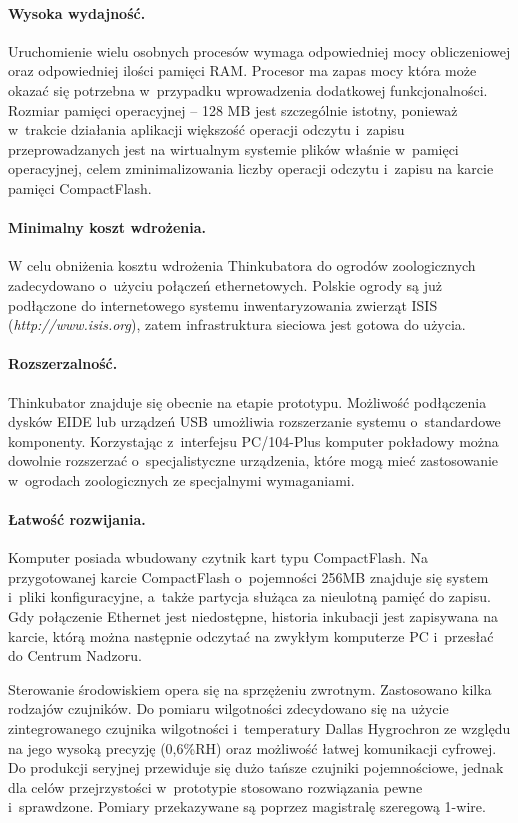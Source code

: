 \paragraph{Wysoka wydajność.}
Uruchomienie wielu osobnych procesów wymaga odpowiedniej mocy obliczeniowej oraz
odpowiedniej ilości pamięci RAM. Procesor ma zapas mocy która może okazać się
potrzebna w~przypadku wprowadzenia dodatkowej funkcjonalności. Rozmiar pamięci
operacyjnej -- 128 MB jest szczególnie istotny, ponieważ w~trakcie działania
aplikacji większość operacji odczytu i~zapisu przeprowadzanych jest na
wirtualnym systemie plików właśnie w~pamięci operacyjnej, celem zminimalizowania
liczby operacji odczytu i~zapisu na karcie pamięci CompactFlash.

\paragraph{Minimalny koszt wdrożenia.}
W celu obniżenia kosztu wdrożenia Thinkubatora do ogrodów zoologicznych
zadecydowano o~użyciu połączeń ethernetowych. Polskie ogrody są już podłączone do
internetowego systemu inwentaryzowania zwierząt ISIS (\emph{http://www.isis.org}),
zatem infrastruktura sieciowa jest gotowa do użycia.

\paragraph{Rozszerzalność.}
Thinkubator znajduje się obecnie na etapie prototypu. Możliwość podłączenia
dysków EIDE lub urządzeń USB umożliwia rozszerzanie systemu o~standardowe
komponenty. Korzystając z~interfejsu PC/104-Plus komputer pokładowy można
dowolnie rozszerzać o~specjalistyczne urządzenia, które mogą mieć zastosowanie
w~ogrodach zoologicznych ze specjalnymi wymaganiami.

\paragraph{Łatwość rozwijania.}
Komputer posiada wbudowany czytnik kart typu CompactFlash. Na przygotowanej karcie CompactFlash
o~pojemności 256MB znajduje się system i~pliki konfiguracyjne, a~także partycja
służąca za nieulotną pamięć do zapisu. Gdy połączenie Ethernet jest niedostępne,
historia inkubacji jest zapisywana na karcie, którą można następnie odczytać na
zwykłym komputerze PC i~przesłać do Centrum Nadzoru.

Sterowanie środowiskiem opera się na sprzężeniu zwrotnym. Zastosowano kilka
rodzajów czujników. Do pomiaru wilgotności zdecydowano się na użycie
zintegrowanego czujnika wilgotności i~temperatury Dallas Hygrochron ze względu
na jego wysoką precyzję (0,6\%RH) oraz możliwość łatwej komunikacji cyfrowej. Do
produkcji seryjnej przewiduje się dużo tańsze czujniki pojemnościowe, jednak dla
celów przejrzystości w~prototypie stosowano rozwiązania pewne i~sprawdzone.
Pomiary przekazywane są poprzez magistralę szeregową 1-wire.

